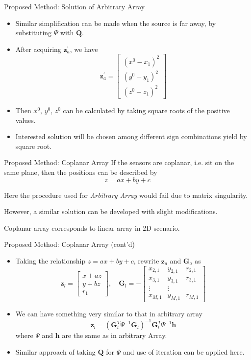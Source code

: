\documentclass[10pt]{beamer}
\begin{document}
\begin{frame}{Proposed Method: Solution of Arbitrary Array}
  \begin{itemize}
    \item Similar simplification can be made when the source is far away,
          by substituting $\Psi$ with $\mathbf{Q}$.
    \item After acquiring $\mathbf{z}_a^{'}$, we have
          $$\mathbf{z}_a^{'}=
            \begin{bmatrix}(x^0-x_1)^2\\(y^0-y_1)^2\\(z^0-z_1)^2\end{bmatrix}$$
    \item Then $x^0$, $y^0$, $z^0$ can be calculated by taking square roots of the positive values.
    \item Interested solution will be chosen among different sign combinations yield by square root.
  \end{itemize}
\end{frame}

\begin{frame}{Proposed Method: Coplanar Array}
  If the sensors are coplanar, i.e. sit on the same plane, then the positions
  can be described by $$z=ax+by+c$$

  Here the procedure used for \emph{Arbitrary Array} would fail due to matrix singularity.

  However, a similar solution can be developed with slight modifications.
  
  Coplanar array corresponds to \alert{linear} array in 2D scenario.
\end{frame}

\begin{frame}{Proposed Method: Coplanar Array (cont'd)}
  \begin{itemize}
    \item Taking the relationship $z=ax+by+c$, rewrite $\mathbf{z}_a$ and $\mathbf{G}_a$
          as
          $$\mathbf{z}_l=\begin{bmatrix}x+az\\y+bz\\r_1\end{bmatrix},\quad
            \mathbf{G}_l=-\begin{bmatrix}
                          x_{2,1} & y_{2,1} & r_{2,1}\\
                          x_{3,1} & y_{3,1} & r_{3,1}\\
                          \vdots  & \vdots \\
                          x_{M,1} & y_{M,1} & r_{M,1}\end{bmatrix}$$
    \item We can have something very similar to that in arbitrary array
          $$\mathbf{z}_l=(\mathbf{G}_l^T\Psi^{-1}\mathbf{G}_l)^{-1}\mathbf{G}_l^T\Psi^{-1}\mathbf{h}$$
          where $\Psi$ and $\mathbf{h}$ are the same as in arbitrary Array.
    \item Similar approach of taking $\mathbf{Q}$ for $\Psi$ and use of iteration can be applied here.
  \end{itemize}
\end{frame}
\end{document}

